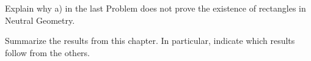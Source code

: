 \documentclass[instructornotes]{ximera}
\begin{document}
\begin{problem}
Explain why a) in the last Problem does not prove the existence of rectangles in Neutral Geometry.
\begin{freeResponse}
\end{freeResponse}
\end{problem}


\begin{problem}
Summarize the results from this chapter. In particular, indicate which
results follow from the others.
\begin{freeResponse}
\end{freeResponse}
\end{problem}
\end{document}
